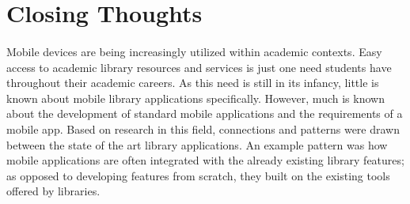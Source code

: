    
    
    \section{Closing Thoughts}
    \paragraph{}
    Mobile devices are being increasingly utilized within academic contexts. Easy access to academic library resources and services is just one need students have throughout their academic careers. As this need is still in its infancy, little is known about mobile library applications specifically. However, much is known about the development of standard mobile applications and the requirements of a mobile app. Based on research in this field, connections and patterns were drawn between the state of the art library applications. An example pattern was how mobile applications are often integrated with the already existing library features; as opposed to developing features from scratch, they built on the existing tools offered by libraries.